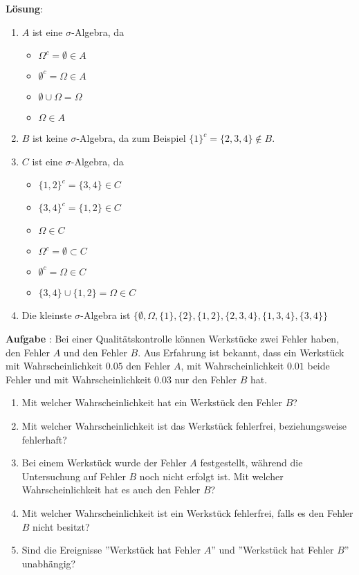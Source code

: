 \documentclass[a4paper,13pt]{scrartcl}
\newcommand{\exercise}{\vspace*{0.2cm}
\stepcounter{aufgabe}
\noindent
\textbf{Aufgabe \arabic{aufgabe}}: }
\newcounter{aufgabe}
\newcommand{\solution}{\vspace*{0.2cm}
\noindent
\textbf{Lösung}: }
\begin{document}
\solution
\begin{enumerate}[label=(\alph*)]
\item $A$ ist eine $\sigma$-Algebra, da 
\begin{itemize}
\item $\Omega^c =  \emptyset \in A$
\item $\emptyset^c = \Omega \in A$
\item $\emptyset \cup \Omega = \Omega$
\item $\Omega \in A$
\end{itemize}
\item $B$ ist keine $\sigma$-Algebra, da zum Beispiel $\{ 1 \}^c = \{ 2,3,4 \} \notin B$.
\item $C$ ist eine   $\sigma$-Algebra, da 
\begin{itemize}
\item $\{ 1,2 \}^c = \{ 3,4 \} \in C$
\item $\{ 3,4 \}^c = \{ 1,2 \} \in C$
\item $\Omega \in C$
\item $ \Omega^c =  \emptyset \subset C$
\item $\emptyset^c = \Omega \in C$
\item $\{ 3,4 \} \cup\{ 1,2 \} = \Omega \in C$
\end{itemize}
\item Die kleinste $\sigma$-Algebra ist $  \{ \emptyset,  \Omega , \{ 1\}, \{ 2\}, \{ 1, 2\},  \{ 2,3,4\}, \{1, 3, 4\}, \{ 3,4\} \} $
\end{enumerate}
\vspace{8mm}


\exercise
Bei einer Qualitätskontrolle können Werkstücke zwei Fehler haben, den Fehler $A$ und den Fehler $B$. Aus Erfahrung ist bekannt, dass ein Werkstück mit Wahrscheinlichkeit $0.05$  den Fehler $A$, mit Wahrscheinlichkeit $0.01$ beide Fehler und mit  Wahrscheinlichkeit $0.03$ nur den Fehler $B$ hat.
\begin{enumerate}[label=(\alph*)]
\item Mit welcher Wahrscheinlichkeit hat ein Werkstück den Fehler $B$?
\item Mit welcher Wahrscheinlichkeit ist das Werkstück fehlerfrei, beziehungsweise fehlerhaft?
\item Bei einem Werkstück wurde der Fehler $A$ festgestellt, während die Untersuchung auf Fehler $B$ noch nicht erfolgt ist. Mit welcher Wahrscheinlichkeit hat es auch den Fehler $B$?
\item Mit welcher Wahrscheinlichkeit ist ein Werkstück fehlerfrei, falls es den Fehler $B$ nicht besitzt?
\item Sind die Ereignisse ''Werkstück hat Fehler $A$''  und ''Werkstück hat Fehler $B$'' unabhängig?
\end{enumerate}
\vspace{4mm}
\end{document}
